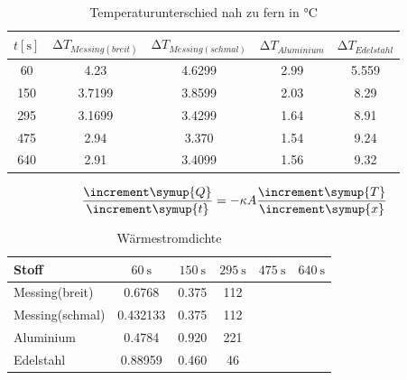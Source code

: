\begin{table}
    \centering
    \caption{Temperaturunterschied nah zu fern in $\si{\celsius}$}
    \label{tab:tempdiff_5_messwerte}
    \begin{tabular}{S[table-format=3, round-mode=places, round-precision=1] S[table-format=1.2, round-mode=places, round-precision=2] S[table-format=1.2, round-mode=places, round-precision=2] S[table-format=1.2, round-mode=places, round-precision=2] S[table-format=1.2, round-mode=places, round-precision=2]}
        \toprule
        {$t[\si{\s}]$} & {$\increment T_{Messing(breit)}$} & {$\increment T_{Messing(schmal)}$} & {$\increment T_{Aluminium}$} & {$\increment T_{Edelstahl}$} \\
          & 4.23   & 4.6299 & 2.99 &	5.559 \\
        150 & 3.7199 & 3.8599 & 2.03 &	8.29 \\
        295 & 3.1699 & 3.4299 & 1.64 &	8.91 \\
        475 & 2.94   & 3.370  & 1.54 &	9.24 \\
        640 & 2.91   & 3.4099 & 1.56 &	9.32 \\
        \bottomrule
    \end{tabular}
\end{table}

\begin{equation}
    \frac{\increment \symup{Q}}{\increment \symup{t}} = -\kappa A \frac{\increment \symup{T}}{\increment \symup{x}}
\end{equation}

\begin{table}
    \centering
    \caption{Wärmestromdichte}
    \label{tab:Warmestrom}
    \begin{tabular}{l | S[round-mode=places, round-precision=4] S[round-mode=places, round-precision=4] S[round-mode=places, round-precision=4] S[round-mode=places, round-precision=4] S[round-mode=places, round-precision=4]}
        \toprule
        {Stoff} & {$\SI{60}{\s}$} & {$\SI{150}{\s}$} & {$\SI{295}{\s}$} & {$\SI{475}{\s}$} & {$\SI{640}{\s}$} \\
        \midrule
        Messing(breit)      & 0.6768  & 0.375 & 112 \\
        Messing(schmal)     & 0.432133  & 0.375 & 112 \\
        Aluminium           & 0.4784 & 0.920 & 221 \\
        Edelstahl           & 0.88959 & 0.460 & 46 \\
        \bottomrule
    \end{tabular}
\end{table}

